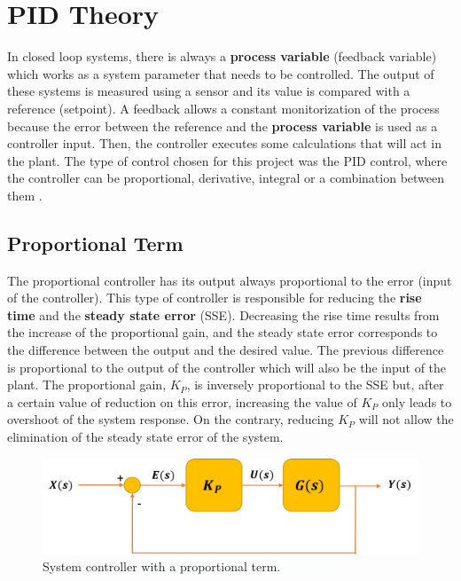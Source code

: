 \section{PID Theory}\label{sec:pid_theory}

In closed loop systems, there is always a \textbf{process variable} (feedback variable) which works as a system parameter that needs to be controlled. The output of these systems is measured using a sensor and its value is compared with a reference (setpoint). A feedback allows a constant monitorization of the process because the error between the reference and the \textbf{process variable} is used as a controller input. Then, the controller executes some calculations that will act in the plant. The type of control chosen for this project was the PID control, where the controller can be proportional, derivative, integral or a combination between them \cite{Feedback}. 

\subsection*{Proportional Term}

The proportional controller has its output always proportional to the error (input of the controller). This type of controller is responsible for reducing the \textbf{rise time} and the \textbf{steady state error} (SSE). Decreasing the rise time results from the increase of the proportional gain, and the steady state error corresponds to the difference between the output and the desired value. The previous difference is proportional to the output of the controller which will also be the input of the plant. The proportional gain, $K_P$, is inversely proportional to the SSE but, after a certain value of reduction on this error, increasing the value of $K_P$ only leads to overshoot of the system response. On the contrary, reducing $K_P$ will not allow the elimination of the steady state error of the system. 

\begin{figure}[H]
	\centering
	\includegraphics[scale=0.6]{figures/propor_controller.png}
	\caption{System controller with a proportional term.}
	\label{propor_controller}
\end{figure}

